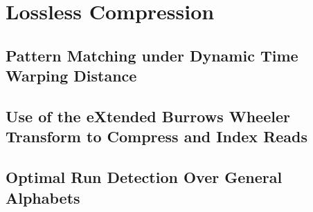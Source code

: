 \clearemptydoublepage
\part{Lossless Compression}

\chapter{Pattern Matching under Dynamic Time Warping Distance}

\chapter{Use of the eXtended Burrows Wheeler Transform to Compress and Index Reads}

\chapter{Optimal Run Detection Over General Alphabets}